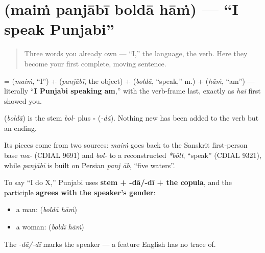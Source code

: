 \section[\texorpdfstring{\pa{ਮੈਂ} \pa{ਪੰਜਾਬੀ} \pa{ਬੋਲਦਾ} \pa{ਹਾਂ} (maiṁ panjābī boldā hāṁ)}{ਮੈਂ ਪੰਜਾਬੀ ਬੋਲਦਾ ਹਾਂ (maiṁ panjābī boldā hāṁ)}]{    (maiṁ panjābī boldā hāṁ) — \textquotedblleft{}I speak Punjabi\textquotedblright{}}

\label{lesson:PA-C05-main-punjabi-bolda-han}



\begin{quote}
Three words you already own — \textquotedblleft{}I,\textquotedblright{} the language, the verb. Here they become your first complete, moving sentence.
\end{quote}

\begin{cousinweb}
\textbf{   } = \textbf{} (\emph{maiṁ}, \textquotedblleft{}I\textquotedblright{}) + \textbf{} (\emph{panjābī}, the object) + \textbf{} (\emph{boldā}, \textquotedblleft{}speak,\textquotedblright{} m.) + \textbf{} (\emph{hāṁ}, \textquotedblleft{}am\textquotedblright{}) — literally \textquotedblleft{}\textbf{I Punjabi speaking am},\textquotedblright{} with the verb-frame last, exactly as \emph{hai} first showed you.

\textbf{} (\emph{boldā}) is the stem \emph{bol-} plus \textbf{-} (\emph{-dā}). Nothing new has been added to the verb but an ending.

Its pieces come from two sources: \emph{maiṁ} goes back to the Sanskrit first-person base \emph{ma-} (CDIAL 9691) and \emph{bol-} to a reconstructed \emph{*bōll}, \textquotedblleft{}speak\textquotedblright{} (CDIAL 9321), while \emph{panjābī} is built on Persian \emph{panj āb}, \textquotedblleft{}five waters\textquotedblright{}.
\end{cousinweb}

\begin{grammarlens}[title={Grammar Lens: the present habitual, gendered}]
To say \textquotedblleft{}I do X,\textquotedblright{} Punjabi uses \textbf{stem + -dā/-dī + the copula}, and the participle \textbf{agrees with the speaker's gender}:

\begin{itemize}
\raggedright
  \item a man: \textbf{   } (\emph{boldā hāṁ})
  \item a woman: \textbf{   } (\emph{boldī hāṁ})
\end{itemize}

The \emph{-dā/-dī} marks the speaker — a feature English has no trace of.
\end{grammarlens}

